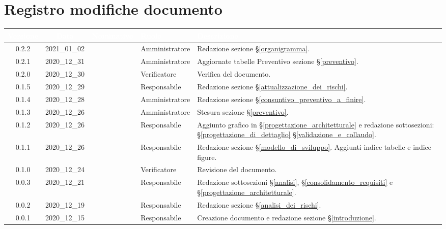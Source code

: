 \section*{Registro modifiche documento}
{

     
\renewcommand{\arraystretch}{1.5}
\centering
\begin{longtable}{ c c  C{3cm} C{3cm} C{5cm}}


 \textcolor{white}{\textbf{Versione}}&
    \textcolor{white}{\textbf{Data}}&
    \textcolor{white}{\textbf{Nominativo}}&
    \textcolor{white}{\textbf{Ruolo}}&
    \textcolor{white}{\textbf{Descrizione}}\\	
    \endhead
	
	0.2.2 & 2021\_01\_02 & \PC{} & Amministratore & Redazione sezione \S\ref{organigramma}. \\

	0.2.1 & 2020\_12\_31 & \TG{} & Amministratore & Aggiornate tabelle Preventivo sezione \S\ref{preventivo}.\\

	0.2.0 & 2020\_12\_30 & \TG{} & Verificatore & Verifica del documento.\\

    0.1.5 & 2020\_12\_29 & \MM{} & Responsabile & Redazione sezione \S\ref{attualizzazione_dei_rischi}. \\

    0.1.4 & 2020\_12\_28 & \PC{} & Amministratore & Redazione sezione \S\ref{consuntivo_preventivo_a_finire}. \\

    0.1.3 & 2020\_12\_26 & \PC{} & Amministratore & Stesura sezione \S\ref{preventivo}. \\

    0.1.2 & 2020\_12\_26 & \MM{} & Responsabile & Aggiunto grafico in \S\ref{progettazione_architetturale} e redazione sottosezioni:  \S\ref{progettazione_di_dettaglio} \S\ref{validazione_e_collaudo}. \\

    0.1.1 & 2020\_12\_26 & \MM{} & Responsabile & Redazione sezione \S\ref{modello_di_sviluppo}. Aggiunti indice tabelle e indice figure. \\

    0.1.0 & 2020\_12\_24 & \PC{} & Verificatore & Revisione del documento.\\

    0.0.3 & 2020\_12\_21 & \MM{} & Responsabile & Redazione sottosezioni \S\ref{analisi}, \S\ref{consolidamento_requisiti} e \S\ref{progettazione_architetturale}. \\

    0.0.2 & 2020\_12\_19 & \MM{} & Responsabile & Redazione sezione \S\ref{analisi_dei_rischi}.\\

    0.0.1 & 2020\_12\_15 & \MM{} & Responsabile & Creazione documento e redazione sezione \S\ref{introduzione}.
			
\end{longtable}
}